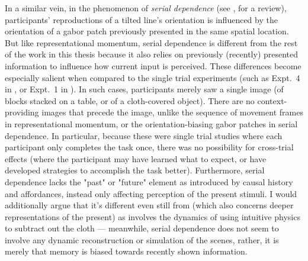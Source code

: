 In a similar vein, in the phenomenon of \textit{serial dependence} (see \cite{fischer_serial_2014}, for a review), participants’ reproductions of a tilted line’s orientation is influenced by the orientation of a gabor patch previously presented in the same spatial location.  But like representational momentum, serial dependence is different from the rest of the work in this thesis because it also relies on previously (recently) presented information to influence how current input is perceived.  These differences become especially salient when compared to the single trial experiments (such as Expt.~4 in , or Expt.~1 in ). In such cases, participants merely saw a single image (of blocks stacked on a table, or of a cloth-covered object). There are no context-providing images that precede the image, unlike the sequence of movement frames in representational momentum, or the orientation-biasing gabor patches in serial dependence. In particular, because these were single trial studies where each participant only completes the task once, there was no possibility for cross-trial effects (where the participant may have learned what to expect, or have developed strategies to accomplish the task better).  Furthermore, serial dependence lacks the "past" or "future" element as introduced by causal history and affordances, instead only affecting perception of the present stimuli. I would additionally argue that it’s different even still from  (which also concerns deeper representations of the present) as  involves the dynamics of using intuitive physics to subtract out the cloth --- meanwhile, serial dependence does not seem to involve any dynamic reconstruction or simulation of the scenes, rather, it is merely that memory is biased towards recently shown information.

